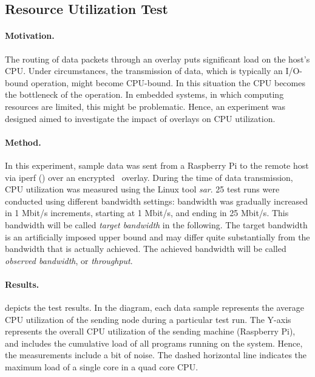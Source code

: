 \subsection{Resource Utilization Test} \label{sec:utilization}
\paragraph{Motivation.} The routing of data packets through an overlay puts significant load on the host's CPU. Under circumstances, the transmission of data, which is typically an I/O-bound operation, might become CPU-bound. In this situation the CPU becomes the bottleneck of the operation. In embedded systems, in which computing resources are limited, this might be problematic. Hence, an experiment was designed aimed to investigate the impact of overlays on CPU utilization.

\paragraph{Method.} In this experiment, sample data was sent from a Raspberry Pi to the remote host via iperf (\cf {}) over an encrypted \wnet\ overlay. During the time of data transmission, CPU utilization was measured using the Linux tool \emph{sar}. 25 test runs were conducted using different bandwidth settings: bandwidth was gradually increased in 1 Mbit/s increments, starting at 1 Mbit/s, and ending in 25 Mbit/s. This bandwidth will be called \emph{target bandwidth} in the following. The target bandwidth is an artificially imposed upper bound and may differ quite substantially from the bandwidth that is actually achieved. The achieved bandwidth will be called \emph{observed bandwidth}, or \emph{throughput}.

\paragraph{Results.}
 depicts the test results. In the diagram, each data sample represents the average CPU utilization of the sending node during a particular test run. The Y-axis represents the overall CPU utilization of the sending machine (Raspberry Pi), and includes the cumulative load of all programs running on the system. Hence, the measurements include a bit of noise. The dashed horizontal line indicates the maximum load of a single core in a quad core CPU.

